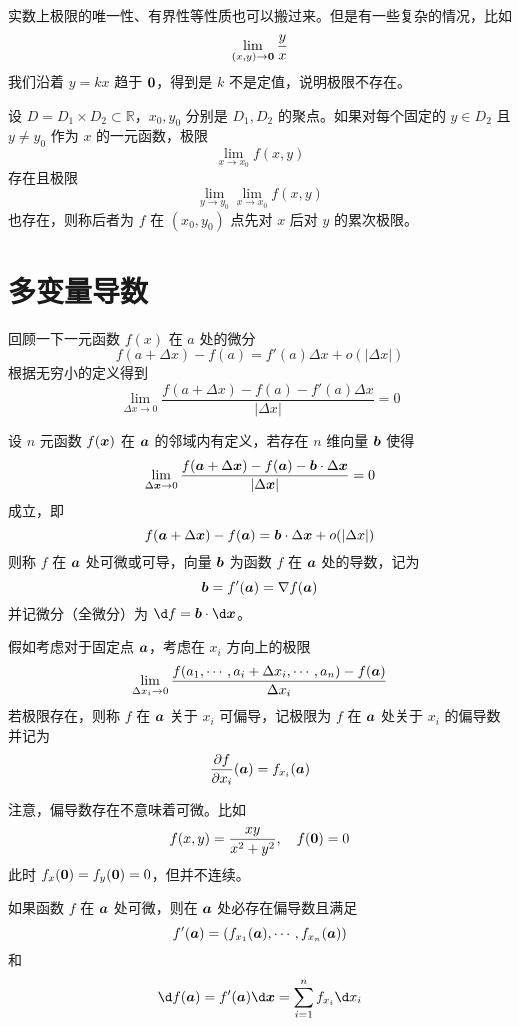 实数上极限的唯一性、有界性等性质也可以搬过来。但是有一些复杂的情况，比如
\[ \lim_{(x, y) \to \boldsymbol{0}} \frac{y}{x} \]
我们沿着 $y = kx$ 趋于 $\boldsymbol{0}$，得到是 $k$ 不是定值，说明极限不存在。

\begin{definition}
	设 $D = D_1 \times D_2 \subset \mathbb{R}$，$x_0, y_0$ 分别是 $D_1, D_2$ 的聚点。如果对每个固定的 $y \in D_2$ 且 $y \neq y_0$ 作为 $x$ 的一元函数，极限
	\[ \lim_{x \to x_0} f(x, y) \]
	存在且极限
	\[ \lim_{y \to y_0} \lim_{x \to x_0} f(x, y) \]
	也存在，则称后者为 $f$ 在 $(x_0, y_0)$ 点先对 $x$ 后对 $y$ 的累次极限。
\end{definition}

\section{多变量导数}

回顾一下一元函数 $f(x)$ 在 $a$ 处的微分
\[ f(a + \Delta x) - f(a) = f'(a) \Delta x + o(|\Delta x|) \]
根据无穷小的定义得到
\[ \lim_{\Delta x \to 0} \frac{f(a + \Delta x) - f(a) - f'(a) \Delta x}{|\Delta x|} = 0 \]

\begin{definition}
	设 $n$ 元函数 $f(\boldsymbol{x})$ 在 $\boldsymbol{a}$ 的邻域内有定义，若存在 $n$ 维向量 $\boldsymbol{b}$ 使得
	\[ \lim_{\Delta \boldsymbol{x} \to 0} \frac{f(\boldsymbol{a} + \Delta \boldsymbol{x}) - f(\boldsymbol{a}) - \boldsymbol{b} \cdot \Delta \boldsymbol{x}}{|\Delta \boldsymbol{x}|} = 0 \]
	成立，即
	\[ f(\boldsymbol{a} + \Delta \boldsymbol{x}) - f(\boldsymbol{a}) = \boldsymbol{b} \cdot \Delta \boldsymbol{x} + o(|\Delta x|) \]
	则称 $f$ 在 $\boldsymbol{a}$ 处可微或可导，向量 $\boldsymbol{b}$ 为函数 $f$ 在 $\boldsymbol{a}$ 处的导数，记为
	\[ \boldsymbol{b} = f'(\boldsymbol{a}) = \nabla f(\boldsymbol{a}) \]
	并记微分（全微分）为 $\d f = \vbf{b} \cdot \d \vbf{x}$。
\end{definition}

假如考虑对于固定点 $\boldsymbol{a}$，考虑在 $x_i$ 方向上的极限
\[ \lim_{\Delta x_i \to 0} \frac{f(a_1, \cdots, a_i + \Delta x_i, \cdots, a_n) - f(\boldsymbol{a})}{\Delta x_i} \]
若极限存在，则称 $f$ 在 $\boldsymbol{a}$ 关于 $x_i$ 可偏导，记极限为 $f$ 在 $\boldsymbol{a}$ 处关于 $x_i$ 的偏导数并记为
\[ \frac{\partial f}{\partial x_i}(\boldsymbol{a}) = f_{x_i}(\boldsymbol{a}) \]

注意，偏导数存在不意味着可微。比如
\[ f(x, y) = \frac{xy}{x^2 + y^2}, \quad f(\boldsymbol{0}) = 0 \]
此时 $f_x(\boldsymbol{0}) = f_y(\boldsymbol{0}) = 0$，但并不连续。

\begin{theorem}
	如果函数 $f$ 在 $\boldsymbol{a}$ 处可微，则在 $\boldsymbol{a}$ 处必存在偏导数且满足
	\[ f'(\boldsymbol{a}) = \left( f_{x_1}(\boldsymbol{a}), \cdots, f_{x_n}(\boldsymbol{a}) \right) \]
	和
	\[ \d f(\vbf{a}) = f'(\vbf{a}) \d \vbf{x} = \sum_{i=1}^n f_{x_i} \d x_i \]
\end{theorem}

